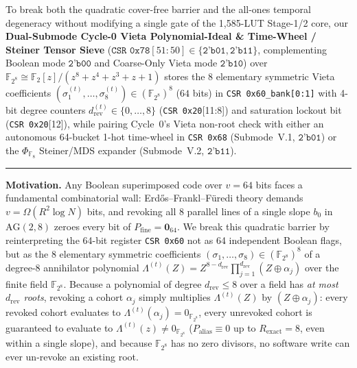 \documentclass[10pt,twocolumn]{article}
\makeatletter
\newif\ifspecintwocol \specintwocolfalse
\newif\ifspecresume   \specresumefalse
\newcommand{\StopTwoCol}{%
  \if@twocolumn
    \onecolumn
    \global\specintwocolfalse
    \let\spec@next\@empty
  \else
    \ifspecintwocol
      \global\specintwocolfalse
      \def\spec@next{\end{multicols}}%
    \else
      \let\spec@next\@empty
    \fi
  \fi
  \spec@next
}
\newcommand{\BeginConnesPlate}{%
  \if@twocolumn
    \onecolumn
    \global\specresumetrue
    \let\spec@platepre\@empty
  \else
    \ifspecintwocol
      \global\specresumetrue
      \let\spec@platepre\StopTwoCol
    \else
      \global\specresumefalse
      \let\spec@platepre\@empty
    \fi
  \fi
  \spec@platepre
  \par\vspace{4pt}\noindent\textcolor{black!25}{\rule{\textwidth}{0.4pt}}\par\vspace{3pt}%
}
\providecommand{\CoreClbLuts}{1,585}
\providecommand{\CorePhysicalLUTs}{\CoreClbLuts}
\theoremstyle{spectralthm}
\makeatother
\begin{document}
To break both the quadratic cover-free barrier and the all-ones temporal degeneracy without modifying a single gate of the \CorePhysicalLUTs-LUT Stage-1/2 core, our \textbf{Dual-Submode Cycle-0 Vieta Polynomial-Ideal \& Time-Wheel / Steiner Tensor Sieve} ($\texttt{CSR~0x78}[51:50] \in \{\texttt{2'b01}, \texttt{2'b11}\}$, complementing Boolean mode $\texttt{2'b00}$ and Coarse-Only Vieta mode $\texttt{2'b10}$) over $\mathbb{F}_{2^8} \cong \mathbb{F}_2[z]/(z^8 + z^4 + z^3 + z + 1)$ stores the 8 elementary symmetric Vieta coefficients $(\sigma_1^{(t)}, \ldots, \sigma_8^{(t)}) \in (\mathbb{F}_{2^8})^8$ ($64$ bits) in \texttt{CSR 0x60\_bank[0:1]} with 4-bit degree counters $d_{\mathrm{rev}}^{(t)} \in \{0,\ldots,8\}$ (\texttt{CSR 0x20}[11:8]) and saturation lockout bit (\texttt{CSR 0x20}[12]), while pairing Cycle~0's Vieta non-root check with either an autonomous 64-bucket 1-hot time-wheel in \texttt{CSR 0x68} (Submode~V.1, $\texttt{2'b01}$) or the $\Phi_{\mathbb{F}_8}$ Steiner/MDS expander (Submode~V.2, $\texttt{2'b11}$).

\BeginConnesPlate
\noindent\textbf{Motivation.}\; Any Boolean superimposed code over $v=64$ bits faces a fundamental combinatorial wall: Erd\H{o}s--Frankl--F\"{u}redi theory demands $v = \Omega(R^2 \log N)$ bits, and revoking all 8 parallel lines of a single slope $b_0$ in $\mathrm{AG}(2,8)$ zeroes every bit of $P_{\mathrm{fine}} = \mathbf{0}_{64}$. We break this quadratic barrier by reinterpreting the 64-bit register \texttt{CSR 0x60} not as 64 independent Boolean flags, but as the 8 elementary symmetric coefficients $(\sigma_1,\ldots,\sigma_8) \in (\mathbb{F}_{2^8})^8$ of a degree-8 annihilator polynomial $\Lambda^{(t)}(Z) = Z^{8-d_{\mathrm{rev}}} \prod_{j=1}^{d_{\mathrm{rev}}} (Z \oplus \alpha_j)$ over the finite field $\mathbb{F}_{2^8}$. Because a polynomial of degree $d_{\mathrm{rev}} \le 8$ over a field has \emph{at most $d_{\mathrm{rev}}$ roots}, revoking a cohort $\alpha_j$ simply multiplies $\Lambda^{(t)}(Z)$ by $(Z \oplus \alpha_j)$: every revoked cohort evaluates to $\Lambda^{(t)}(\alpha_j) = 0_{\mathbb{F}_{2^8}}$, every unrevoked cohort is guaranteed to evaluate to $\Lambda^{(t)}(z) \neq 0_{\mathbb{F}_{2^8}}$ ($P_{\mathrm{alias}} \equiv 0$ up to $R_{\mathrm{exact}} = 8$, even within a single slope), and because $\mathbb{F}_{2^8}$ has no zero divisors, no software write can ever un-revoke an existing root.
\end{document}
